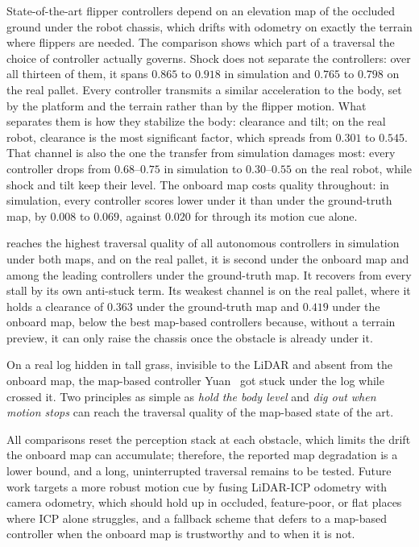 State-of-the-art flipper controllers depend on an elevation map of the occluded ground under
the robot chassis, which drifts with odometry on exactly the terrain where flippers are needed.
The comparison shows which part of a traversal the choice of controller actually
governs. Shock does not separate the controllers: over all thirteen of them, it spans $0.865$ to $0.918$ in simulation and $0.765$ to $0.798$ on the real pallet. Every controller
transmits a similar acceleration to the body, set by the platform and the terrain rather
than by the flipper motion.
What separates them is how they stabilize the body: clearance and
tilt; on the real robot, clearance is the most significant factor, which spreads from $0.301$ to $0.545$. That channel is also the one the transfer from
simulation damages most: every controller drops from $0.68$--$0.75$ in simulation to
$0.30$--$0.55$ on the real robot, while shock and
tilt keep their level. The onboard
map costs quality throughout: in simulation, every controller scores lower under it than
under the ground-truth map, by $0.008$ to $0.069$, against $0.020$ for \SAS{} through its
motion cue alone.

\SAS{} reaches the highest traversal quality of all autonomous controllers in simulation under both
maps, and on the real pallet, it is second under the onboard
map and among the leading controllers under the ground-truth map. It recovers from every stall by its own anti-stuck term. Its weakest channel is on the real pallet, where it holds a clearance of $0.363$ under the
ground-truth map and $0.419$ under the onboard map, below the best map-based controllers because,
 without a terrain preview, it can only raise the chassis once the obstacle is already
under it. 

On a real log hidden in tall grass, invisible to the LiDAR and absent from the
onboard map, the map-based controller Yuan~\cite{yuan2019} got stuck under the log while \SAS{} crossed it.
Two principles as simple as \emph{hold the body level} and \emph{dig out when motion
stops} can reach the traversal quality of the map-based state of the art.

All comparisons reset the perception stack at each obstacle, which limits the drift the
onboard map can accumulate; therefore, the reported map degradation is a lower bound, and a long,
uninterrupted traversal remains to be tested.
Future work targets a more robust motion cue by fusing LiDAR-ICP odometry with camera
odometry, which should hold up in occluded, feature-poor, or flat places where ICP alone struggles, and a fallback scheme that defers to a map-based
controller when the onboard map is trustworthy and to \SAS{} when it is not.
